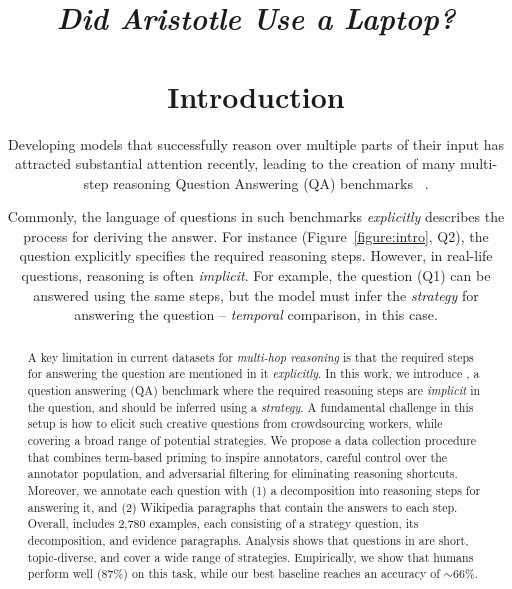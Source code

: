 \title{\emph{Did Aristotle Use a Laptop?}



\maketitle

\begin{abstract}
A key limitation in current datasets for \emph{multi-hop reasoning} is that the required steps for answering the question are mentioned in it \emph{explicitly}.
In this work, we introduce \strategyqa{}, a question answering (QA) benchmark where the required reasoning steps are \emph{implicit} in the question, and should be inferred using a \emph{strategy}.
A fundamental challenge in this setup is how to elicit such creative questions from crowdsourcing workers, while covering a broad range of potential strategies. We propose a data collection procedure that combines term-based priming to inspire annotators, careful control over the annotator population, and adversarial filtering for eliminating reasoning shortcuts.
Moreover, we annotate each question with (1) a decomposition into reasoning steps for answering it, and 
(2) Wikipedia paragraphs that contain the answers to each step.
Overall, \strategyqa{} includes 2,780 examples, each consisting of a strategy question, its decomposition, and evidence paragraphs.
Analysis shows that questions in \strategyqa{} are short, topic-diverse, and cover a wide range of strategies.
Empirically, we show that humans perform well ($87$\%) on this task, while our best baseline reaches an accuracy of $\sim 66\%$. 

\end{abstract}

\section{Introduction}
\label{sec:introduction}

Developing models that successfully reason over multiple parts of their input has attracted substantial attention recently, leading to the creation of many multi-step reasoning Question Answering (QA) benchmarks
~\cite{welbl2018constructing,talmor2018web,khashabi2018looking,yang2018hotpotqa,dua2019drop,suhr2019corpus}.

Commonly, the language of questions in such benchmarks \emph{explicitly} describes the process for deriving the answer. For instance (Figure~\ref{figure:intro}, Q2), the question  explicitly specifies the required reasoning steps. However, in real-life questions, reasoning is often \emph{implicit}. For example, the question  (Q1) can be answered using the same steps, but the model must infer the \emph{strategy} for answering the question -- \emph{temporal} comparison, in this case.

}
